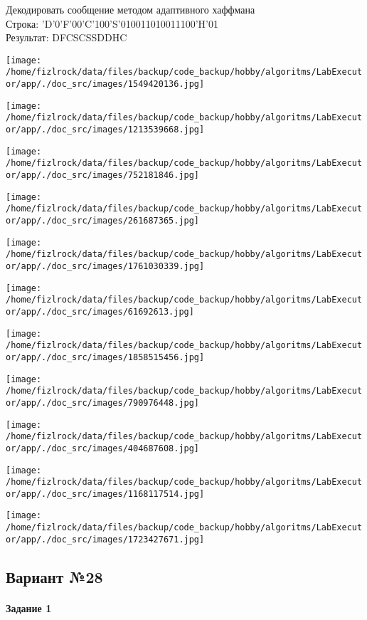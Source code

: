 \documentclass[a4paper, 12pt]{article}
\begin{document}
Декодировать сообщение методом адаптивного хаффмана \\
Строка: 
'D'0'F'00'C'100'S'010011010011100'H'01\\
Результат: DFCSCSSDDHC

\texttt{[image: /home/fizlrock/data/files/backup/code\_backup/hobby/algoritms/LabExecutor/app/./doc\_src/images/1549420136.jpg]}

\texttt{[image: /home/fizlrock/data/files/backup/code\_backup/hobby/algoritms/LabExecutor/app/./doc\_src/images/1213539668.jpg]}

\texttt{[image: /home/fizlrock/data/files/backup/code\_backup/hobby/algoritms/LabExecutor/app/./doc\_src/images/752181846.jpg]}

\texttt{[image: /home/fizlrock/data/files/backup/code\_backup/hobby/algoritms/LabExecutor/app/./doc\_src/images/261687365.jpg]}

\texttt{[image: /home/fizlrock/data/files/backup/code\_backup/hobby/algoritms/LabExecutor/app/./doc\_src/images/1761030339.jpg]}

\texttt{[image: /home/fizlrock/data/files/backup/code\_backup/hobby/algoritms/LabExecutor/app/./doc\_src/images/61692613.jpg]}

\texttt{[image: /home/fizlrock/data/files/backup/code\_backup/hobby/algoritms/LabExecutor/app/./doc\_src/images/1858515456.jpg]}

\texttt{[image: /home/fizlrock/data/files/backup/code\_backup/hobby/algoritms/LabExecutor/app/./doc\_src/images/790976448.jpg]}

\texttt{[image: /home/fizlrock/data/files/backup/code\_backup/hobby/algoritms/LabExecutor/app/./doc\_src/images/404687608.jpg]}

\texttt{[image: /home/fizlrock/data/files/backup/code\_backup/hobby/algoritms/LabExecutor/app/./doc\_src/images/1168117514.jpg]}

\texttt{[image: /home/fizlrock/data/files/backup/code\_backup/hobby/algoritms/LabExecutor/app/./doc\_src/images/1723427671.jpg]}
\pagebreak
\subsection{Вариант №28}
\paragraph{Задание 1}
\end{document}
